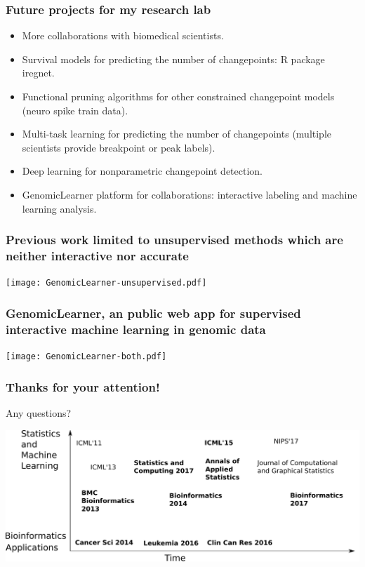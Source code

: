 \documentclass{beamer}
\begin{document}
\begin{frame}
  \frametitle{Future projects for my research lab}
  \begin{itemize}
  \item More collaborations with biomedical scientists.
  \item Survival models for predicting the number of changepoints: R
    package iregnet.
  \item Functional pruning algorithms for other constrained
    changepoint models (neuro spike train data).
  \item Multi-task learning for predicting the number of changepoints
    (multiple scientists provide breakpoint or peak labels).
  \item Deep learning for nonparametric changepoint detection.
  \item GenomicLearner platform for collaborations: interactive
    labeling and machine learning analysis.
  \end{itemize}
\end{frame}

\begin{frame}
  \frametitle{Previous work limited to 
    unsupervised methods
which are neither interactive nor accurate
}
  \texttt{[image: GenomicLearner-unsupervised.pdf]}
\end{frame}

\begin{frame}
  \frametitle{GenomicLearner, an public web app for supervised interactive machine learning in genomic data}
  \texttt{[image: GenomicLearner-both.pdf]}
\end{frame}


\begin{frame}
  \frametitle{Thanks for your attention!}

Any questions?

\hskip 1cm

\includegraphics[width=\textwidth]{timeline-SteJustine}




\end{frame}
\end{document}
